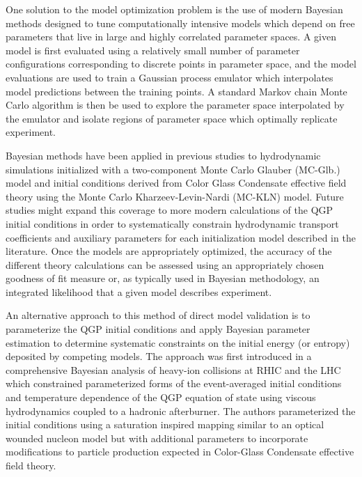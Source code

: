 \documentclass[aps,prc,reprint,amsmath]{revtex4-1}
\begin{document}
One solution to the model optimization problem is the use of modern Bayesian methods designed to tune computationally intensive models which depend on free parameters that live in large and highly correlated parameter spaces. A given model is first evaluated using a relatively small number of parameter configurations corresponding to discrete points in parameter space, and the model evaluations are used to train a Gaussian process emulator which interpolates model predictions between the training points. A standard Markov chain Monte Carlo algorithm is then be used to explore the parameter space interpolated by the emulator and isolate regions of parameter space which optimally replicate experiment. 

Bayesian methods have been applied in previous studies to hydrodynamic simulations initialized with a two-component Monte Carlo Glauber (MC-Glb.) model and initial conditions derived from Color Glass Condensate effective field theory using the Monte Carlo Kharzeev-Levin-Nardi (MC-KLN) model. Future studies might expand this coverage to more modern calculations of the QGP initial conditions in order to systematically constrain hydrodynamic transport coefficients and auxiliary parameters for each initialization model described in the literature. Once the models are appropriately optimized, the accuracy of the different theory calculations can be assessed using an appropriately chosen goodness of fit measure or, as typically used in Bayesian methodology, an integrated likelihood that a given model describes experiment. 

An alternative approach to this method of direct model validation is to parameterize the QGP initial conditions and apply Bayesian parameter estimation to determine systematic constraints on the initial energy (or entropy) deposited by competing models. The approach was first introduced in a comprehensive Bayesian analysis of heavy-ion collisions at RHIC and the LHC which constrained parameterized forms of the event-averaged initial conditions and temperature dependence of the QGP equation of state using viscous hydrodynamics coupled to a hadronic afterburner. The authors parameterized the initial conditions using a saturation inspired mapping similar to an optical wounded nucleon model but with additional parameters to incorporate modifications to particle production expected in Color-Glass Condensate effective field theory.
\end{document}
